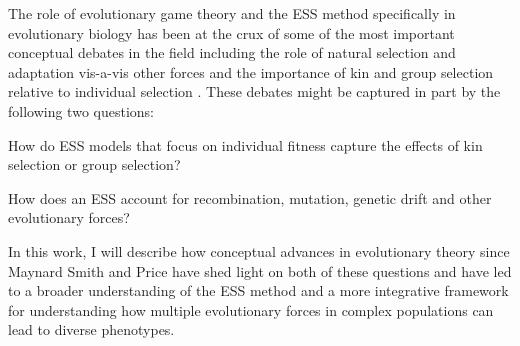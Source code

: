 \documentclass[11pt]{article}
\begin{document}
The role of evolutionary game theory and the ESS method specifically in evolutionary biology has been at the crux of some of the most important conceptual debates in the field including the role of natural selection and adaptation vis-a-vis other forces \cite[e.g.,][]{MaynardSmith:1978,Gould:Lewontin:1979,Lewontin:1979,Orzack:Sober:1994,Gardner:2017,Kern:Hahn:2018,Jensen:Payseur:2019} and the importance of kin and group selection relative to individual selection
\cite[e.g.,][]{Maynard-Smith:1964,Hamilton:1963,Price:1972:cov,Wilson:Wilson:2007,Leigh:2010,Akcay:VanCleve:2012,West:Griffin:2007,Gardner:Grafen:2009,Nowak:Tarnita:2010,Abbot:Abe:2011,Allen:Nowak:2013,Birch:2014,Birch:2017,Nowak:McAvoy:2017}. These debates might be captured in part by the following two questions: \begin{ilnum} \item \label{q:I} How do ESS models that focus on individual fitness capture the effects of kin selection or group selection? \item \label{q:II} How does an ESS account for recombination, mutation, genetic drift and other evolutionary forces? \end{ilnum} In this work, I will describe how conceptual advances in evolutionary theory since Maynard Smith and Price \cite{Maynard-Smith:Price:1973} have shed light on both of these questions and have led to a broader understanding of the ESS method and a more integrative framework for understanding how multiple evolutionary forces in complex populations can lead to diverse phenotypes.
\end{document}
